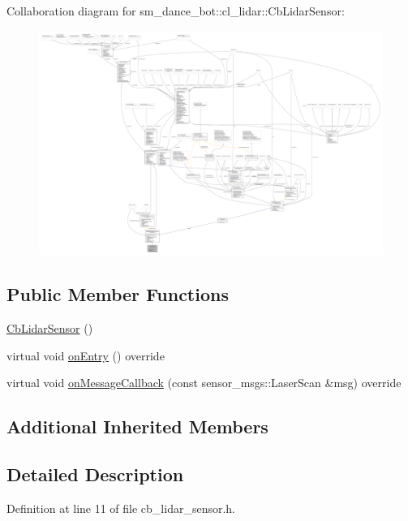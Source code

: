 Collaboration diagram for sm\+\_\+dance\+\_\+bot\+:\+:cl\+\_\+lidar\+:\+:Cb\+Lidar\+Sensor\+:
\nopagebreak
\begin{figure}[H]
\begin{center}
\leavevmode
\includegraphics[width=350pt]{structsm__dance__bot_1_1cl__lidar_1_1CbLidarSensor__coll__graph}
\end{center}
\end{figure}
\subsection*{Public Member Functions}
\begin{DoxyCompactItemize}
\item 
\hyperlink{structsm__dance__bot_1_1cl__lidar_1_1CbLidarSensor_ab1a62a26b0d3dc6f4014bb15db0aa218}{Cb\+Lidar\+Sensor} ()
\item 
virtual void \hyperlink{structsm__dance__bot_1_1cl__lidar_1_1CbLidarSensor_aad3468a6ae78999c9fd01bdb81b42a49}{on\+Entry} () override
\item 
virtual void \hyperlink{structsm__dance__bot_1_1cl__lidar_1_1CbLidarSensor_a9f9cc01c88137995883845178eb0bed0}{on\+Message\+Callback} (const sensor\+\_\+msgs\+::\+Laser\+Scan \&msg) override
\end{DoxyCompactItemize}
\subsection*{Additional Inherited Members}


\subsection{Detailed Description}


Definition at line 11 of file cb\+\_\+lidar\+\_\+sensor.\+h.



